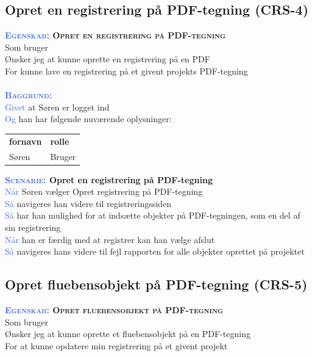 \subsection{Opret en registrering på PDF-tegning (CRS-4)} \label{sec:USOpretRegPåPDF}
\textbf{\textsc{\textcolor{RoyalBlue}{Egenskab:} Opret en registrering på PDF-tegning}}\\
Som bruger\\
Ønsker jeg at kunne oprette en registrering på en PDF\\
For kunne lave en registrering på et givent projekts PDF-tegning \\ \\

\textsc{\textcolor{RoyalBlue}{\textbf{Baggrund:}}}\\
\textcolor{RoyalBlue}{Givet} at Søren er logget ind\\
\textcolor{RoyalBlue}{Og} han har følgende nuværende oplysninger:\\
\begin{tabular}{| l | l |}
	\textbf{fornavn} & \textbf{rolle} \\
	Søren & Bruger\\
\end{tabular}

\textbf{\textsc{\textcolor{RoyalBlue}{Scenarie:}} Opret en registrering på PDF-tegning}\\
\textcolor{RoyalBlue}{Når} Søren vælger Opret registrering på PDF-tegning\\
\textcolor{RoyalBlue}{Så}  navigeres han videre til registreringssiden\\
\textcolor{RoyalBlue}{Så}  har han mulighed for at indsætte objekter på PDF-tegningen, som en del af sin registrering\\
\textcolor{RoyalBlue}{Når} han er færdig med at registrer kan han vælge afslut \\
\textcolor{RoyalBlue}{Så}  navigeres hans videre til fejl rapporten for alle objekter oprettet på projektet \\

\subsection{Opret fluebensobjekt på PDF-tegning (CRS-5)} \label{sec:USOpretFlueben}
\textbf{\textsc{\textcolor{RoyalBlue}{Egenskab:} Opret fluebensobjekt på PDF-tegning}}\\
Som bruger\\
Ønsker jeg at kunne oprette et fluebensobjekt på en PDF-tegning\\
For at kunne opdatere min registrering på et givent projekt \\

